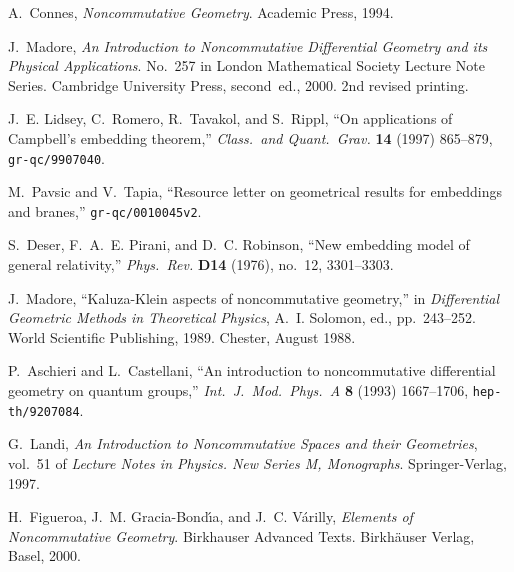 \documentclass[12pt,a4paper]{article}
\newcounter{theorem}
\newcounter{eg}
\begin{document}
%
%

\providecommand{\href}[2]{#2}\begingroup\raggedright\begin{thebibliography}{10}

A.~Connes, {\em Noncommutative Geometry}.
\newblock Academic Press, 1994.

J.~Madore, {\em An Introduction to Noncommutative Differential Geometry and its
  Physical Applications}.
\newblock No.~257 in London Mathematical Society Lecture Note Series. Cambridge
  University Press, second~ed., 2000.
\newblock 2nd revised printing.

J.~E. Lidsey, C.~Romero, R.~Tavakol, and S.~Rippl, ``On applications of
  {C}ampbell's embedding theorem,'' {\em Class.\ and Quant.\ Grav.} {\bf 14}
  (1997) 865--879,
\href{http://xxx.lanl.gov/abs/gr-qc/9907040}{{\tt gr-qc/9907040}}.

M.~Pavsic and V.~Tapia, ``Resource letter on geometrical results for embeddings
  and branes,''
\href{http://xxx.lanl.gov/abs/gr-qc/0010045v2}{{\tt gr-qc/0010045v2}}.

S.~Deser, F.~A.~E. Pirani, and D.~C. Robinson, ``New embedding model of general
  relativity,'' {\em Phys.\ Rev.} {\bf D14} (1976), no.~12, 3301--3303.

J.~Madore, ``{K}aluza-{K}lein aspects of noncommutative geometry,'' in {\em
  Differential Geometric Methods in Theoretical Physics}, A.~I. Solomon, ed.,
  pp.~243--252.
\newblock World Scientific Publishing, 1989.
\newblock Chester, August 1988.

P.~Aschieri and L.~Castellani, ``An introduction to noncommutative differential
  geometry on quantum groups,'' {\em Int.\ J.~Mod.\ Phys.~A} {\bf 8} (1993)
  1667--1706,
\href{http://xxx.lanl.gov/abs/hep-th/9207084}{{\tt hep-th/9207084}}.

G.~Landi, {\em An Introduction to Noncommutative Spaces and their Geometries},
  vol.~51 of {\em Lecture Notes in Physics. New Series M, Monographs}.
\newblock Springer-Verlag, 1997.

H.~Figueroa, J.~M. Gracia-Bond{\'\i a}, and J.~C. V{\'a}rilly, {\em Elements of
  Noncommutative Geometry}.
\newblock Birkhauser Advanced Texts. Birkh{\"a}user Verlag, Basel, 2000.


\end{thebibliography}
\end{document}
